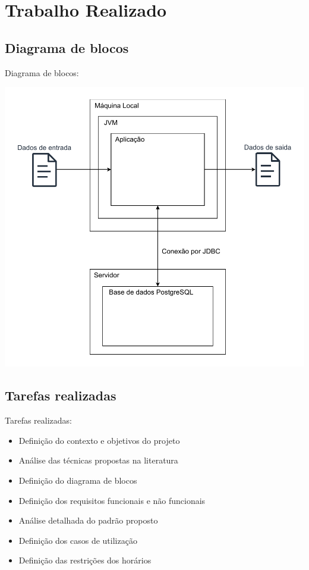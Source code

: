 \documentclass[11]{beamer}
\begin{document}
    \section{Trabalho Realizado}

    \subsection{Diagrama de blocos}

    \begin{frame}
        Diagrama de blocos:
        \begin{center}
            \includegraphics[width=.85\linewidth]{img/diagrama-blocos.pdf}
        \end{center}
    \end{frame}

    \subsection{Tarefas realizadas}

    \begin{frame}
        \justifying
        Tarefas realizadas:
        \begin{itemize}
            \item Definição do contexto e objetivos do projeto
            \item Análise das técnicas propostas na literatura
            \item Definição do diagrama de blocos
            \item Definição dos requisitos funcionais e não funcionais
            \item Análise detalhada do padrão proposto
            \item Definição dos casos de utilização
            \item Definição das restrições dos horários
        \end{itemize}
    \end{frame}
\end{document}
